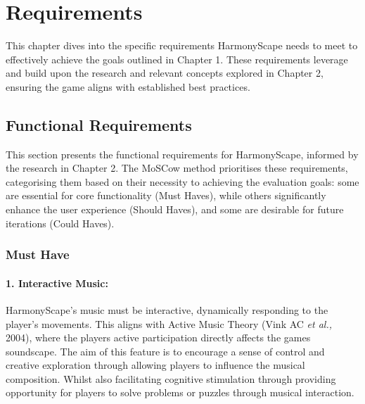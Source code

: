 \documentclass{l4proj}
\begin{document}
\chapter{Requirements}



This chapter dives into the specific requirements HarmonyScape needs to meet to effectively achieve the goals outlined in Chapter 1. These requirements leverage and build upon the research and relevant concepts explored in Chapter 2, ensuring the game aligns with established best practices.

\section{Functional Requirements}
This section presents the functional requirements for HarmonyScape, informed by the research in Chapter 2. The MoSCow method prioritises these requirements, categorising them based on their necessity to achieving the evaluation goals: some are essential for core functionality (Must Haves), while others significantly enhance the user experience (Should Haves), and some are desirable for future iterations (Could Haves).

\subsection{Must Have}
\subsubsection{1. Interactive Music:} HarmonyScape's music must be interactive, dynamically responding to the player's movements. This aligns with Active Music Theory (Vink AC \emph{et al.,} 2004), where the players active participation directly affects the games soundscape. The aim of this feature is to encourage a sense of control and creative exploration through allowing players to influence the musical composition. Whilst also facilitating cognitive stimulation through providing opportunity for players to solve problems or puzzles through musical interaction.
\end{document}
